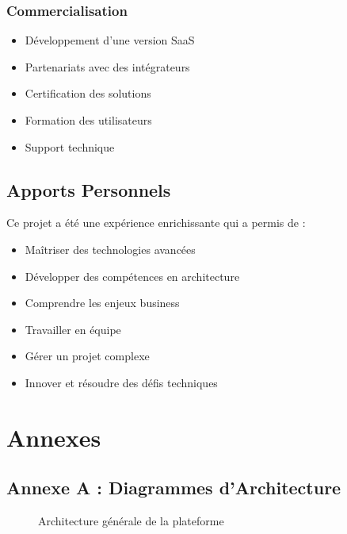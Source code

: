 \documentclass[12pt,a4paper]{article}
\begin{document}
\subsubsection{Commercialisation}
\begin{itemize}
    \item Développement d'une version SaaS
    \item Partenariats avec des intégrateurs
    \item Certification des solutions
    \item Formation des utilisateurs
    \item Support technique
\end{itemize}

\subsection{Apports Personnels}

Ce projet a été une expérience enrichissante qui a permis de :
\begin{itemize}
    \item Maîtriser des technologies avancées
    \item Développer des compétences en architecture
    \item Comprendre les enjeux business
    \item Travailler en équipe
    \item Gérer un projet complexe
    \item Innover et résoudre des défis techniques
\end{itemize}

\section{Annexes}

\subsection{Annexe A : Diagrammes d'Architecture}

\begin{figure}[H]
\centering
{}
\caption{Architecture générale de la plateforme}
\end{figure}
\end{document}
